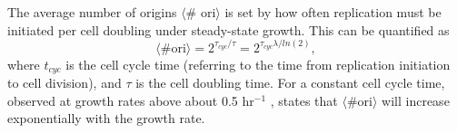 The average number of origins $\langle$\# ori$\rangle$ is set by how often
replication must be initiated per cell doubling under steady-state growth.
This can be quantified as
\begin{equation}
    \langle \text{\# ori} \rangle = 2^{\tau_{cyc} / \tau} = 2^{\tau_{cyc} \lambda / ln(2)},
    \label{eq:Nori}
\end{equation}
where $t_{cyc}$ is the cell cycle time (referring to the time from replication
initiation to cell division), and $\tau$ is the cell doubling time. For a
constant cell cycle time, observed at growth rates above about 0.5 hr$^{-1}$
\citep{helmstetter1968},  states that $\langle \text{\# ori} \rangle$ will increase
exponentially with the growth rate.








